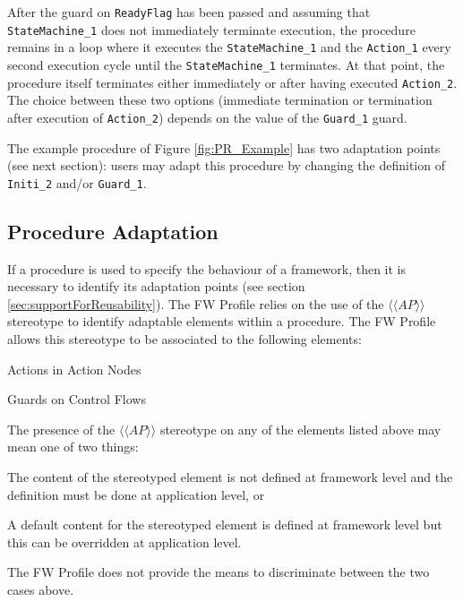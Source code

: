 \documentclass[a4paper,10pt]{article}
\newenvironment{fw_itemize}						%
{\begin{itemize}
  \setlength{\itemsep}{1mm}
  \setlength{\parskip}{0pt}
  \setlength{\parsep}{0pt}}
{\end{itemize}}
\newenvironment{fw_enumerate}					%
{\begin{enumerate}
  \setlength{\itemsep}{1mm}
  \setlength{\parskip}{0pt}
  \setlength{\parsep}{0pt}}
{\end{enumerate}}
\begin{document}
After the guard on \texttt{ReadyFlag} has been passed and assuming that \texttt{StateMachine\_1} does not immediately terminate execution, the procedure remains in a loop where it executes the \texttt{StateMachine\_1} and the \texttt{Action\_1} every second execution cycle until the \texttt{StateMachine\_1} terminates. At that point, the procedure itself terminates either immediately or after having executed \texttt{Action\_2}. The choice between these two options (immediate termination or termination after execution of \texttt{Action\_2}) depends on the value of the \texttt{Guard\_1} guard.

The example procedure of Figure \ref{fig:PR_Example} has two adaptation points (see next section): users may adapt this procedure by changing the definition of \texttt{Initi\_2} and/or \texttt{Guard\_1}.

\subsection{Procedure Adaptation}\label{sec:procAdaptation} 
If a procedure is used to specify the behaviour of a framework, then it is necessary to identify its adaptation points (see section \ref{sec:supportForReusability}). The FW Profile relies on the use of the $\langle\langle AP \rangle\rangle$ stereotype to identify adaptable elements within a procedure. 
The FW Profile allows this stereotype to be associated to the following elements:

\begin{fw_itemize} 
\item Actions in Action Nodes
\item Guards on Control Flows
\end{fw_itemize}

The presence of the $\langle\langle AP \rangle\rangle$ stereotype on any of the elements listed above may mean one of two things:

\begin{fw_enumerate} 
\item The content of the stereotyped element is not defined at framework level and the
definition must be done at application level, or
\item A default content for the stereotyped element is defined at framework level but this
can be overridden at application level.
\end{fw_enumerate}

The FW Profile does not provide the means to discriminate between the two cases above.
\end{document}
